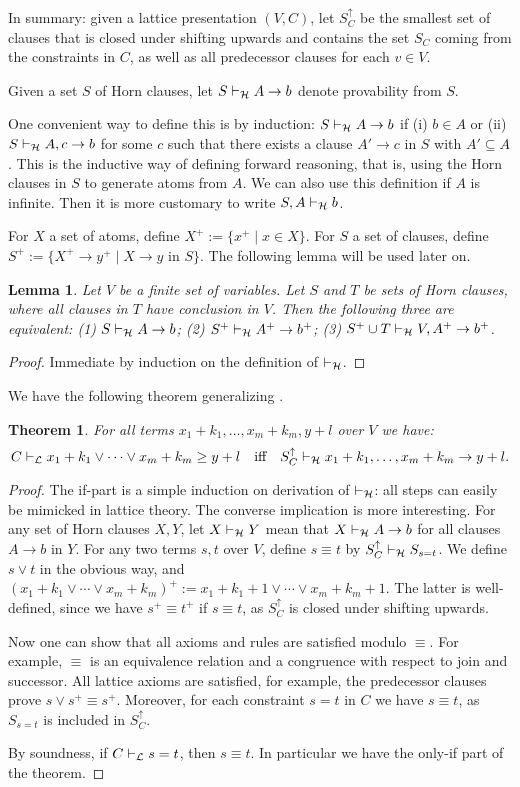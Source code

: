 \documentclass[11pt,a4paper]{article}
\newtheorem{theorem}{Theorem}[section]
\newtheorem{lemma}{Lemma}[theorem]
\newcommand\set[1]{\{#1\}}
\newcommand\jterm[3]{{{#1_1}+{#2_1}}\vee\cdots\vee{{#1_#3}+{#2_#3}}}
\newcommand\jbody[3]{{{#1_1}+{#2_1}},\ldots,{{#1_#3}+{#2_#3}}}
\newcommand\lathy{{\cal L}}
\newcommand\prvL{\vdash_{\lathy}}
\newcommand\prvH{\vdash_{\cal H}}
\begin{document}
In summary: given a lattice presentation $(V,C)$,
let $S^\uparrow_C$ be the smallest set of clauses that 
is closed under shifting upwards and contains
the set $S_C$ coming from the constraints in $C$,
as well as all predecessor clauses for each $v\in V$. 

Given a set $S$ of Horn clauses,
let $S\prvH A\to b$ denote provability from $S$.
{\color{red}%
One convenient way to define this is by induction:
$S\prvH A\to b$ if 
(i) $b\in A$ or 
(ii) $S\prvH A,c\to b$ for some $c$ such that there exists
a clause $A'\to c$ in $S$ with $A'\subseteq A$.
This is the inductive way of defining forward reasoning,
that is, using the Horn clauses in $S$ to generate atoms from $A$.
We can also use this definition if $A$ is infinite.
Then it is more customary to write $S,A \prvH b$.

For $X$ a set of atoms, define $X^+ := \set{x^+\mid x\in X}$.
For $S$ a set of clauses, define 
$S^+ := \set{X^+\to y^+ \mid \text{$X\to y$ in $S$}}$.
The following lemma will be used later on.

\begin{lemma}\label{lem:shift-up}
Let $V$ be a finite set of variables.
Let $S$ and $T$ be sets of Horn clauses, where all clauses in $T$ 
have conclusion in $V$. Then the following three are equivalent:
(1) $S\prvH A\to b$; (2) $S^+\prvH A^+\to b^+$; (3) $S^+ \cup T \prvH V,A^+\to b^+$.
\end{lemma} 
\begin{proof} 
Immediate by induction on the definition of $\prvH$.
\end{proof}
}

We have the following theorem generalizing \cite[Theorem 3]{Lorenzen51}.

\begin{theorem}\label{thm:LvsH}
For all terms $\jbody{x}{k}{m},y+l$ over $V$ we have:
\[
C\prvL \jterm{x}{k}{m}\geq y+l 
\quad\text{iff}\quad
S^\uparrow_C\prvH \jbody{x}{k}{m}\to y+l.
\]
\end{theorem} 
\begin{proof}
The if-part is a simple induction on derivation of $\prvH$:
all steps can easily be mimicked in lattice theory.
The converse implication is more interesting.
For any set of Horn clauses $X,Y$, let $X \prvH Y$ mean
that $X \prvH A\to b$ for all clauses $A\to b$ in $Y$.
For any two terms $s,t$ over $V$, define $s\equiv t$ by
$S^\uparrow_C \prvH S_{s=t}$. We define $s\vee t$ in the obvious way,
and $(\jterm{x}{k}{m})^+ := x_1+k_1+1 \vee\cdots\vee x_m+k_m+1$.
The latter is well-defined, since we have $s^+\equiv t^+$ 
if $s\equiv t$, as $S^\uparrow_C$ is closed under shifting upwards.

Now one can show that all axioms and rules are satisfied modulo $\equiv$. 
For example, $\equiv$ is an equivalence relation and
a congruence with respect to join and successor.
All lattice axioms are satisfied, for example,
the predecessor clauses prove $s\vee s^+ \equiv s^+$. 
Moreover, for each constraint $s=t$ in $C$ 
we have $s\equiv t$, as $S_{s=t}$ is included in $S^\uparrow_C$.

By soundness, if $C\prvL s=t$, then $s\equiv t$.
In particular we have the only-if part of the theorem.
\end{proof}
\end{document}
